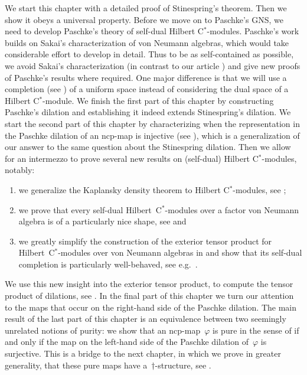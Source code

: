 \documentclass[b]{subfiles}
\begin{document}
\begin{parsec}
\begin{point}
We start this chapter with a detailed proof of Stinespring's theorem.
Then we show it obeys a universal property.
Before we move on to Paschke's GNS,
    we need to develop Paschke's theory of self-dual Hilbert C$^*$-modules.
Paschke's work builds on Sakai's characterization of von Neumann algebras,
    which would take considerable effort to develop in detail.
Thus to be as self-contained as possible,
    we avoid Sakai's characterization (in contrast to our
        article \cite{wwpaschke})
    and give new proofs
    of Paschke's results where required.
One major difference is that we will use
    a completion (see ) of a uniform space
    instead of considering the dual space of a Hilbert C$^*$-module.
We finish the first part of this chapter
    by constructing Paschke's dilation
    and establishing it indeed extends Stinespring's dilation.
We start the second part of this chapter
    by characterizing when the representation in the Paschke dilation
    of an ncp-map is injective (see ),
    which is a generalization of our answer \cite{stineinj}
    to the same question about the Stinespring dilation.
Then we allow for an intermezzo
    to prove several new results on (self-dual) Hilbert C$^*$-modules,
    notably:
\begin{enumerate}
    \item
    we generalize the Kaplansky density theorem
    to Hilbert C$^*$-modules, see ;
    \item
   we prove that every self-dual Hilbert~C$^*$-modules over
            a factor von Neumann algebra
            is of a particularly nice shape,
            see  and
    \item
    we greatly simplify the construction of the exterior tensor product
        for Hilbert~C$^*$-modules over von Neumann algebras
        in 
        and show that its self-dual completion
        is particularly well-behaved, see e.g.~.
\end{enumerate}
We use this new insight into the exterior tensor product,
    to compute the tensor product
    of dilations, see .
In the final part of this chapter we turn our attention to the maps
    that occur on the right-hand side of the Paschke dilation.
The main result of the last part of this chapter
    is an equivalence between two seemingly unrelated notions of purity:
    we show that an ncp-map~$\varphi$ is pure in the sense of 
    if and only if the map on the left-hand side of
    the Paschke dilation of~$\varphi$ is surjective.
This is a bridge to the next chapter,
    in which we prove in greater generality,
    that these pure maps have a~$\dagger$-structure,
    see .
\end{point}
\end{parsec}
\end{document}
